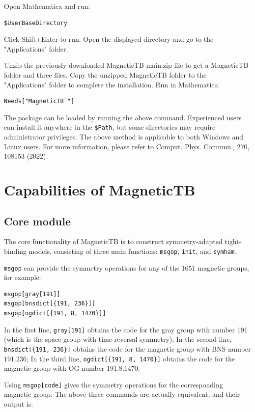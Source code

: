 \documentclass[titlepage,a4paper,12pt,AutoFakeBold]{article}
\begin{document}
Open Mathematica and run:
\begin{lstlisting}[numbers=none]
$UserBaseDirectory
\end{lstlisting}
Click Shift+Enter to run. Open the displayed directory and go to the "Applications" folder.

Unzip the previously downloaded MagneticTB-main.zip file to get a MagneticTB folder and three files. Copy the unzipped MagneticTB folder to the "Applications" folder to complete the installation. Run in Mathematica:
\begin{lstlisting}[numbers=none]
Needs["MagneticTB`"]
\end{lstlisting}	
The package can be loaded by running the above command. Experienced users can install it anywhere in the \lstinline|$Path|, but some directories may require administrator privileges. The above method is applicable to both Windows and Linux users. For more information, please refer to Comput. Phys. Commun., 270, 108153 (2022).

\section{Capabilities of MagneticTB}
\subsection{Core module}
The core functionality of \textsf{MagneticTB} is to construct symmetry-adapted tight-binding models, consisting of three main functions: \lstinline|msgop|, \lstinline|init|, and \lstinline|symham|.

\lstinline|msgop| can provide the symmetry operations for any of the 1651 magnetic groups, for example:
\begin{lstlisting}
msgop[gray[191]]
msgop[bnsdict[{191, 236}]]
msgop[ogdict[{191, 8, 1470}]]
\end{lstlisting}	
In the first line, \lstinline|gray[191]| obtains the code for the gray group with number 191 (which is the space group with time-reversal symmetry);
In the second line, \lstinline|bnsdict[{191, 236}]| obtains the code for the magnetic group with BNS number $191.236$;
In the third line, \lstinline|ogdict[{191, 8, 1470}]| obtains the code for the magnetic group with OG number $191.8.1470$.

Using \lstinline|msgop[code]| gives the symmetry operations for the corresponding magnetic group. The above three commands are actually equivalent, and their output is:
\end{document}
